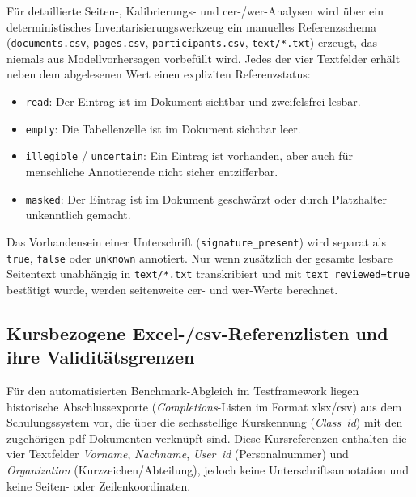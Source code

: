 Für detaillierte Seiten-, Kalibrierungs- und \ac{cer}-/\ac{wer}-Analysen wird über ein deterministisches Inventarisierungswerkzeug ein manuelles Referenzschema (\texttt{documents.csv}, \texttt{pages.csv}, \texttt{participants.csv}, \texttt{text/*.txt}) erzeugt, das niemals aus Modellvorhersagen vorbefüllt wird. Jedes der vier Textfelder erhält neben dem abgelesenen Wert einen expliziten Referenzstatus:
\begin{itemize}
  \item \texttt{read}: Der Eintrag ist im Dokument sichtbar und zweifelsfrei lesbar.
  \item \texttt{empty}: Die Tabellenzelle ist im Dokument sichtbar leer.
  \item \texttt{illegible} / \texttt{uncertain}: Ein Eintrag ist vorhanden, aber auch für menschliche Annotierende nicht sicher entzifferbar.
  \item \texttt{masked}: Der Eintrag ist im Dokument geschwärzt oder durch Platzhalter unkenntlich gemacht.
\end{itemize}
Das Vorhandensein einer Unterschrift (\texttt{signature\_present}) wird separat als \texttt{true}, \texttt{false} oder \texttt{unknown} annotiert. Nur wenn zusätzlich der gesamte lesbare Seitentext unabhängig in \texttt{text/*.txt} transkribiert und mit \texttt{text\_reviewed=true} bestätigt wurde, werden seitenweite \ac{cer}- und \ac{wer}-Werte berechnet.

\subsection{Kursbezogene Excel-/\texorpdfstring{\ac{csv}}{CSV}-Referenzlisten und ihre Validitätsgrenzen}
\label{subsec:kurs-gt}

Für den automatisierten Benchmark-Abgleich im Testframework liegen historische Abschlussexporte (\emph{Completions}-Listen im Format \ac{xlsx}/\ac{csv}) aus dem Schulungssystem vor, die über die sechsstellige Kurskennung (\emph{Class~\ac{id}}) mit den zugehörigen \ac{pdf}-Dokumenten verknüpft sind. Diese Kursreferenzen enthalten die vier Textfelder \emph{Vorname}, \emph{Nachname}, \emph{User~\ac{id}} (Personalnummer) und \emph{Organization} (Kurzzeichen/Abteilung), jedoch keine Unterschriftsannotation und keine Seiten- oder Zeilenkoordinaten.

